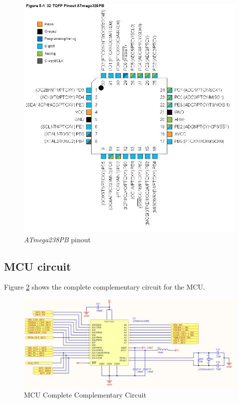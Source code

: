 		\begin{figure}[htbp]
			\centering
			\includegraphics[scale=0.5]{figuras/fig-atmega328pb.png}
			\caption{\textit{ATmega238PB} pinout \cite{atmega328p-datasheet}}
			\label{fig:atmega328pb}
		\end{figure}
		

		\subsection{MCU circuit}\label{ssec:mcu-circuit}

		Figure \ref{fig:mcu-circuit} shows the complete complementary circuit for the MCU.

		\begin{figure}[htbp]
			\centering
			\includegraphics[scale=0.7]{figuras/fig-mcu-circuit.png}
			\caption{MCU Complete Complementary Circuit \cite{mcu-circuit}}
			\label{fig:mcu-circuit}
		\end{figure}

